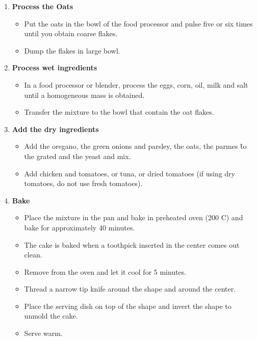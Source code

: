 \documentclass[11pt,letterpaper]{article}
\newcommand \fileName {BoloCaipiraComAveia}
\begin{document}
\begin {description}
\begin {enumerate}
\item {\bf Process the Oats}
\begin {itemize}
\item Put the oats in the bowl of the food processor and pulse five or six times until you obtain coarse flakes.
\item Dump the flakes in  large bowl.
\end {itemize}

\item {\bf Process wet ingredients}
\begin {itemize}
\item In a food processor or blender, process the eggs, corn, oil, milk and salt until a homogeneous mass is obtained.
\item         Transfer the mixture to the bowl that contain the oat flakes.
\end {itemize}
\item {\bf Add the dry ingredients}
\begin {itemize}
\item Add the oregano, the green onions and parsley, the oats, the parmes \~ to the grated and the yeast and mix.
\item Add chicken and tomatoes, or tuna, or dried tomatoes (if using dry tomatoes, do not use fresh tomatoes).
\end {itemize}
\item {\bf Bake}
\begin {itemize}
\item Place the mixture in the pan and bake in preheated oven (200 C) and bake for approximately 40 minutes.
\item The cake is baked when a toothpick inserted in the center comes out clean.
\item Remove from the oven and let it cool for 5 minutes.
\item Thread a narrow tip knife around the shape and around the center.
\item Place the serving dish on top of the shape and invert the shape to unmold the cake.
\item Serve warm.
	\end{itemize}
	\end{enumerate}
\end{description}


\end{document}
